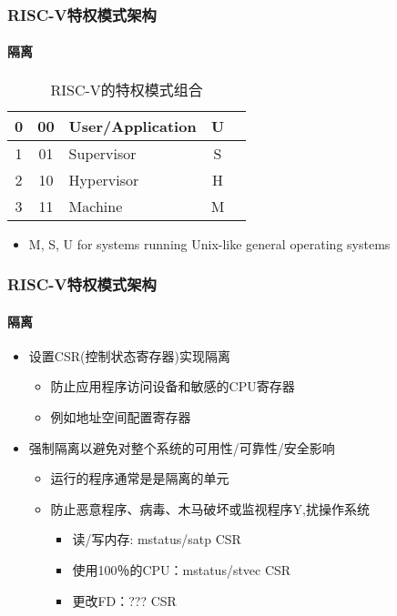 \begin{frame}
		\frametitle{RISC-V特权模式架构}
		\framesubtitle{隔离}
\begin{table}[h]
	\caption{RISC-V的特权模式组合}
 	\centering
 	\begin{tabular}{|c|c|l|c|l|}
 	\hline
	0 & 00 & User/Application & U \\\hline
	1 & 01 & Supervisor & S \\\hline
	2 & 10 & Hypervisor & H \\\hline
	3 & 11 & Machine & M \\\hline
   \end{tabular}
   \end{table}
\begin{itemize}
	
	\item M, S, U  for systems running Unix-like general operating systems
\end{itemize}


\end{frame}




\begin{frame}
	\frametitle{RISC-V特权模式架构}
	\framesubtitle{隔离}

	\begin{itemize}
		\item 设置CSR(控制状态寄存器)实现隔离
		\begin{itemize}
			\item 防止应用程序访问设备和敏感的CPU寄存器
			\item 例如地址空间配置寄存器
		\end{itemize} 
	\end{itemize}

	\begin{itemize}
		\item 强制隔离以避免对整个系统的可用性/可靠性/安全影响
		\begin{itemize}
		\item 运行的程序通常是是隔离的单元
		\item 防止恶意程序、病毒、木马破坏或监视程序Y,扰操作系统	
			\begin{itemize}
			\item 读/写内存: mstatus/satp CSR
			\item 使用100％的CPU：mstatus/stvec CSR
			\item 更改FD：??? CSR
			\end{itemize}
		\end{itemize}
	\end{itemize}

\end{frame}



